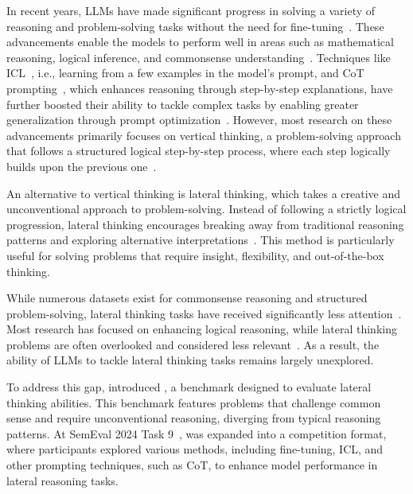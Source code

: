 In recent years, \acp{LLM} have made significant progress in solving a variety of reasoning and problem-solving tasks without the need for fine-tuning~\cite{radfordLanguageModelsAre2019}. These advancements enable the models to perform well in areas such as mathematical reasoning, logical inference, and commonsense understanding~\cite{panLogicLMEmpoweringLarge2023, qiaoReasoningLanguageModel2023, naveedComprehensiveOverviewLarge2024}. Techniques like \ac{ICL}~\cite{brownLanguageModelsAre2020}, i.e., learning from a few examples in the model's prompt, and \ac{CoT} prompting~\cite{weiChainofThoughtPromptingElicits2023}, which enhances reasoning through step-by-step explanations, have further boosted their ability to tackle complex tasks by enabling greater generalization through prompt optimization~\cite{brownLanguageModelsAre2020,weiChainofThoughtPromptingElicits2023}. However, most research on these advancements primarily focuses on vertical thinking, a problem-solving approach that follows a structured logical step-by-step process, where each step logically builds upon the previous one~\cite{jiangBRAINTEASERLateralThinking2023}.

An alternative to vertical thinking is lateral thinking, which takes a creative and unconventional approach to problem-solving. Instead of following a strictly logical progression, lateral thinking encourages breaking away from traditional reasoning patterns and exploring alternative interpretations~\cite{jiangBRAINTEASERLateralThinking2023, jiangSemEval2024Task92024}. This method is particularly useful for solving problems that require insight, flexibility, and out-of-the-box thinking.

While numerous datasets exist for commonsense reasoning and structured problem-solving, lateral thinking tasks have received significantly less attention~\cite{jiangBRAINTEASERLateralThinking2023, jiangSemEval2024Task92024}. Most research has focused on enhancing logical reasoning, while lateral thinking problems are often overlooked and considered less relevant~\cite{jiangBRAINTEASERLateralThinking2023, jiangSemEval2024Task92024}. As a result, the ability of \acp{LLM} to tackle lateral thinking tasks remains largely unexplored.

To address this gap, \textcite{jiangBRAINTEASERLateralThinking2023} introduced , a benchmark designed to evaluate lateral thinking abilities. This benchmark features problems that challenge common sense and require unconventional reasoning, diverging from typical reasoning patterns. At SemEval 2024 Task 9~\cite{jiangSemEval2024Task92024},  was expanded into a competition format, where participants explored various methods, including fine-tuning, \ac{ICL}, and other prompting techniques, such as \ac{CoT}, to enhance model performance in lateral reasoning tasks.

